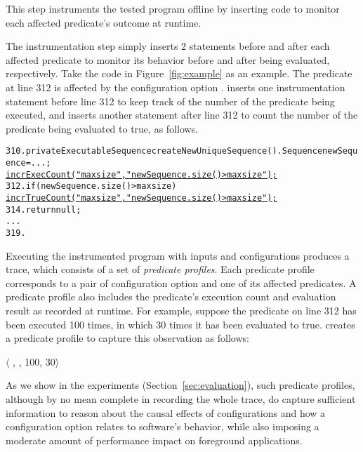 This step instruments the tested program offline
by inserting code to monitor each affected predicate's outcome
at runtime.

The instrumentation step simply inserts 2 statements
before and after each affected predicate to monitor
its behavior before and after being evaluated, respectively. Take
the code in Figure~\ref{fig:example} as an example.
The predicate at line 312 is affected by
the configuration option . \ourtool inserts
one instrumentation statement before line 312 to
keep track of the number of the predicate being executed, and
inserts another statement after line 312 to count the number
of the predicate being evaluated to true, as follows.


\begin{CodeOut}
\begin{alltt}
310. private ExecutableSequence createNewUniqueSequence() .   Sequence newSequence = ...; 
       \underline{incrExecCount("maxsize", "newSequence.size() > maxsize");}
312.   if (newSequence.size() > maxsize) \ttlcb
         \underline{incrTrueCount("maxsize", "newSequence.size() > maxsize");}
314.     return null;
      ...
319. \ttrcb
\end{alltt}
\end{CodeOut}


Executing the instrumented program with inputs and configurations
produces a trace, which consists of a set of \textit{predicate profiles}.
Each predicate profile corresponds to a pair of configuration option
and one of its affected predicates. A predicate profile also includes
the predicate's execution count and evaluation result as recorded at runtime. For example,
suppose the predicate on line 312 has been executed 100 times, in which
30 times it has been evaluated to true. \ourtool creates a predicate
profile to capture this observation as follows:

$\langle$ , , 100, 30$\rangle$ 



As we show in the experiments (Section~\ref{sec:evaluation}),
such predicate profiles, although by no mean complete in
recording the whole trace, do capture
sufficient information to reason about the causal effects of configurations
and how a configuration option relates to software's behavior, while
also imposing a moderate amount of performance impact
on foreground applications.





